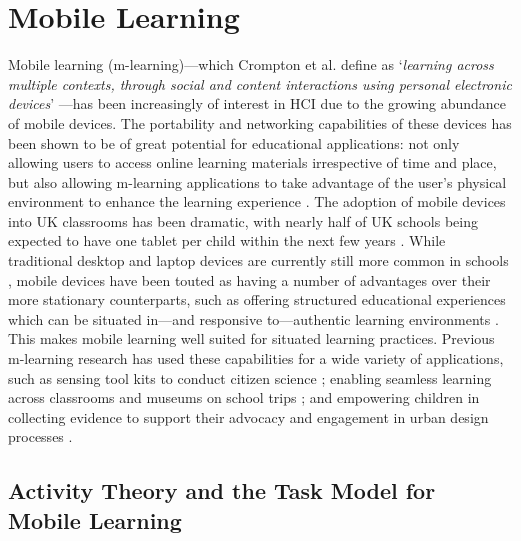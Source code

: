 \section{Mobile Learning}
Mobile learning (m-learning)—which Crompton et al. define as `\textit{learning across multiple contexts, through social and content interactions using personal electronic devices}' \citep{Crompton2013}—has been increasingly of interest in HCI due to the growing abundance of mobile devices. The portability and networking capabilities of these devices has been shown to be of great potential for educational applications: not only allowing users to access online learning materials irrespective of time and place, but also allowing m-learning applications to take advantage of the user’s physical environment to enhance the learning experience \citep{Frohberg2009}. The adoption of mobile devices into UK classrooms has been dramatic, with nearly half of UK schools being expected to have one tablet per child within the next few years \citep{BritishEducationalSuppliersAssociation2015}. While traditional desktop and laptop devices are currently still more common in schools \citep{BritishEducationalSuppliersAssociation2017}, mobile devices have been touted as having a number of advantages over their more stationary counterparts, such as offering structured educational experiences which can be situated in---and responsive to---authentic learning environments \citep{Traxler2011}. This makes mobile learning well suited for situated learning practices. Previous m-learning research has used these capabilities for a wide variety of applications, such as sensing tool kits to conduct citizen science \citep{Sharples2017}; enabling seamless learning across classrooms and museums on school trips \citep{Vavoula2009}; and empowering children in collecting evidence to support their advocacy and engagement in urban design processes \citep{Peacock2018}.

\subsection{Activity Theory and the Task Model for Mobile Learning}
\label{sec:ActivityTheory}

